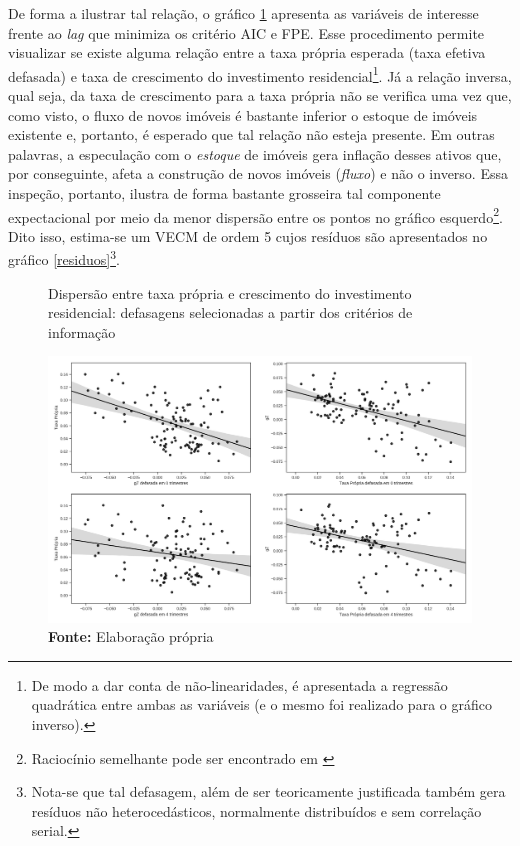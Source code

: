 De forma a ilustrar tal relação, o gráfico \ref{defasagens} apresenta as variáveis de interesse frente ao \textit{lag} que minimiza os critério AIC e FPE. Esse procedimento permite visualizar se existe alguma relação entre a taxa própria esperada (taxa efetiva defasada) e taxa de crescimento do investimento residencial\footnote{De modo a dar conta de não-linearidades, é apresentada a regressão quadrática entre ambas as variáveis (e o mesmo foi realizado para o gráfico inverso).}. Já a relação inversa, qual seja, da taxa de crescimento para a taxa própria não se verifica uma vez que, como visto, o fluxo de novos imóveis é bastante inferior o estoque de imóveis existente e, portanto, é esperado que tal relação não esteja presente. Em outras palavras, a especulação com o \textit{estoque}  de imóveis gera inflação desses ativos que, por conseguinte, afeta a construção de novos imóveis (\textit{fluxo}) e não o inverso. Essa inspeção, portanto, ilustra de forma bastante grosseira tal componente expectacional por meio da menor dispersão entre os pontos no gráfico esquerdo\footnote{Raciocínio semelhante pode ser encontrado em \textcite{girardi_autonomous_2015}}.  Dito isso,  estima-se um VECM de ordem 5 cujos resíduos são apresentados no gráfico \ref{residuos}\footnote{Nota-se que tal defasagem, além de ser teoricamente justificada também gera resíduos não heterocedásticos, normalmente distribuídos e sem correlação serial.}.

\begin{figure}[htb]
	\centering
	\caption{Dispersão entre taxa própria e crescimento do investimento residencial: defasagens selecionadas a partir dos critérios de informação}
	\label{defasagens}
	\includegraphics[width=\textwidth]{../../Modelo/SeriesTemporais/figs/VEC_Defasagens.png}
	\caption*{\textbf{Fonte:} Elaboração própria}
\end{figure}


